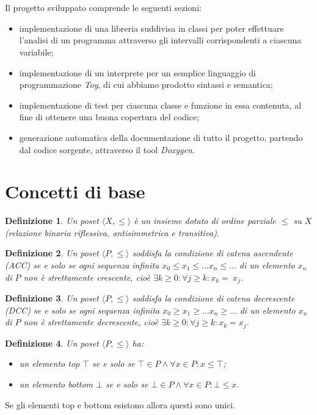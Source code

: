 \documentclass[a4paper, 10pt]{report}
\newtheorem{definit}{Definizione}
\begin{document}
\\\\
Il progetto sviluppato comprende le seguenti sezioni:
\begin{itemize}
	\item implementazione di una libreria suddivisa in classi per poter effettuare l'analisi di un programma attraverso gli intervalli corrispondenti a ciascuna variabile;
	\item implementazione di un interprete per un semplice linguaggio di programmazione \textit{Toy}, di cui abbiamo prodotto sintassi e semantica;
	\item implementazione di test per ciascuna classe e funzione in essa contenuta, al fine di ottenere una buona copertura del codice;
	\item generazione automatica della documentazione di tutto il progetto, partendo dal codice sorgente, attraverso il tool \textit{Doxygen}.
\end{itemize}


\chapter*{Concetti di base}
\begin{definit}
	Un poset $\langle X, \leq \rangle$ è un insieme dotato di ordine parziale  $\leq$ su $X$ (relazione binaria riflessiva, antisimmetrica e transitiva).
\end{definit}

\begin{definit}
	Un poset $\langle P, \leq \rangle$ soddisfa la condizione di catena ascendente (ACC) se e solo se ogni sequenza infinita $ x_0 \leq x_1 \leq ... x_n \leq ...$ di un elemento $x_n$ di $P$ non è strettamente crescente, cioè $\exists k \geq 0 : \forall j \geq k : x_k =~x_j$.
\end{definit}

\begin{definit}
	Un poset $\langle P, \leq \rangle$ soddisfa la condizione di catena decrescente (DCC) se e solo se ogni sequenza infinita $ x_0 \geq x_1 \geq ... x_n \geq ...$ di un elemento $x_n$ di $P$ non è strettamente decrescente, cioè $\exists k \geq 0 : \forall j \geq k : x_k = x_j$.
\end{definit}

\begin{definit}
	Un poset $\langle P, \leq \rangle$  ha:
	\begin{itemize}
		\item un elemento top $\top$ se e solo se $\top \in P \wedge \forall x \in P : x \leq \top$;
		\item un elemento bottom $\bot$ se e solo se $\bot \in P \wedge \forall x \in P : \bot \leq x$.
	\end{itemize}
\end{definit}
Se gli elementi top e bottom esistono allora questi sono unici.
\end{document}
